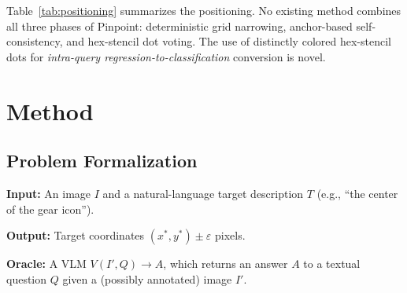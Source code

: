 \documentclass[sigconf,nonacm]{acmart}
\begin{document}
\begin{table}[t]
\caption{Comparison of approaches. Pinpoint combines deterministic
  grid narrowing, anchor declaration, and hex-stencil dot voting---a
  combination absent from all prior work.}
\label{tab:positioning}
\end{table}

Table~\ref{tab:positioning} summarizes the positioning.
No existing method combines all three phases of Pinpoint:
deterministic grid narrowing, anchor-based self-consistency, and
hex-stencil dot voting.
The use of distinctly colored hex-stencil dots for \emph{intra-query
regression-to-classification} conversion is novel.


\section{Method}

\subsection{Problem Formalization}
\label{sec:formalization}

\textbf{Input:} An image $I$ and a natural-language target description
$T$ (e.g., ``the center of the gear icon'').

\textbf{Output:} Target coordinates $(x^*, y^*) \pm \varepsilon$ pixels.

\textbf{Oracle:} A VLM $V(I', Q) \to A$, which returns an answer $A$
to a textual question $Q$ given a (possibly annotated) image $I'$.
\end{document}
